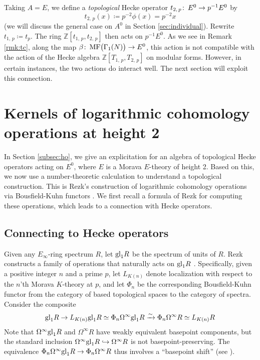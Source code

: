 \documentclass{gtpart}
\theoremstyle{definition}
\theoremstyle{remark}
\def\co{\colon\thinspace}
\newcommand{\mb}[1]{\mathbb{#1}}
\newcommand{\BZ}{{\mb Z}}
\newcommand{\MF}{{\rm MF}}
\newcommand{\B}{\beta}
\newcommand{\G}{\Gamma}
\newcommand{\ce}{\coloneqq}
\renewcommand{\=}{\approx}
\renewcommand{\-}{\sim}
\newcommand{\gl}{{\rm gl}}
\numberwithin{equation}{section}
\begin{document}
Taking $A = E$, we define a {\em topological} Hecke operator 
$t_{2,\,p} \co E^0 \to p^{-1} E^0$ by 
\begin{equation}
 \label{t2p}
 t_{2,\,p}(x) \ce p^{-2} \phi(x) = p^{-2} x 
\end{equation}
(we will discuss the general case on $A^0$ in Section \ref{sec:individual}).  
Rewrite $t_{1,\,p} \ce t_p$.  The ring $\BZ[t_{1,\,p},t_{2,\,p}]$ then acts on 
$p^{-1} E^0$.  As we see in Remark \ref{rmk:tc}, along the map 
$\B \co \MF\big(\G_1(N)\big) \to E^0$, this action is not compatible with the 
action of the Hecke algebra $\BZ[T_{1,\,p},T_{2,\,p}]$ on modular forms.  
However, in certain instances, the two actions do interact well.  The next 
section will exploit this connection.  



\section{Kernels of logarithmic cohomology operations at height 2}
\label{sec:kerlog}

In Section \ref{subsec:ho}, we give an explicitation for an algebra of 
topological Hecke operators acting on $E^0$, where $E$ is a Morava $E$-theory of 
height 2.  Based on this, we now use a number-theoretic calculation to 
understand a topological construction.  This is Rezk's construction of 
logarithmic cohomology operations via Bousfield-Kuhn functors \cite{log}.  We 
first recall a formula of Rezk for computing these operations, which leads to a 
connection with Hecke operators.  



\subsection{Connecting to Hecke operators}

Given any $E_\infty$-ring spectrum $R$, let $\gl_1 R$ be the spectrum of units 
of $R$.  Rezk constructs a family of operations that naturally acts on $\gl_1 R$ 
\cite[Definition 3.6]{log}.  Specifically, given a positive integer $n$ and a 
prime $p$, let $L_{K(n)}$ denote localization with respect to the $n$'th Morava 
$K$-theory at $p$, and let $\Phi_n$ be the corresponding Bousfield-Kuhn functor 
from the category of based topological spaces to the category of spectra.  
Consider the composite 
\begin{equation}
 \label{log}
 \gl_1 R \to L_{K(n)} \gl_1 R \simeq \Phi_n \Omega^\infty \gl_1 R 
 \xrightarrow{\sim} \Phi_n \Omega^\infty R \simeq L_{K(n)} R 
\end{equation}
Note that $\Omega^\infty \gl_1 R$ and $\Omega^\infty R$ have weakly equivalent 
basepoint components, but the standard inclusion 
$\Omega^\infty \gl_1 R \hookrightarrow \Omega^\infty R$ is not 
basepoint-preserving.  The equivalence 
$\Phi_n \Omega^\infty \gl_1 R \to \Phi_n \Omega^\infty R$ thus involves a 
``basepoint shift'' (see \cite[3.4]{log}).  
\end{document}
